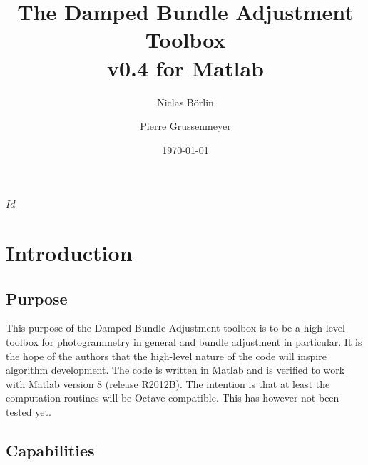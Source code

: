 \documentclass{article}
\begin{document}


\svnInfo $Id$

\newcommand{\dbatversion}{0.4}

\title{The Damped Bundle Adjustment Toolbox\\v\dbatversion{} for Matlab}

\author[1]{Niclas B{\"o}rlin}
\author[2]{Pierre Grussenmeyer}
\date{\today}

\maketitle

\newpage

\tableofcontents

\newpage

\section{Introduction}

\subsection{Purpose}

This purpose of the Damped Bundle Adjustment toolbox is to be a
high-level toolbox for photogrammetry in general and bundle adjustment
in particular. It is the hope of the authors that the high-level
nature of the code will inspire algorithm development. The code is
written in Matlab and is verified to work with Matlab version 8
(release R2012B). The intention is that at least the computation
routines will be Octave-compatible. This has however not been tested
yet.

\subsection{Capabilities}
\end{document}
